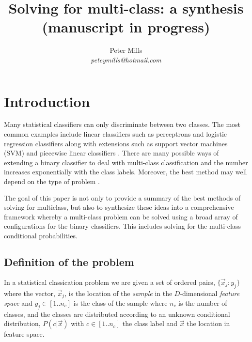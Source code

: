 \documentclass{article}
\begin{document}
\title{Solving for multi-class: a synthesis\\(manuscript in progress)}

\author{Peter Mills\\\textit{peteymills@hotmail.com}}

\maketitle

\section{Introduction}

Many statistical classifiers can only discriminate between two classes.
The most common examples include linear classifiers such as perceptrons and
logistic regression classifiers \citep{Michie_etal1994} along with extensions
such as support vector machines (SVM) \citep{Mueller_etal2001} and 
piecewise linear classifiers \citep{Mills2011, Bagirov2005}.
There are many possible ways of extending a binary classifier to deal
with multi-class classification and the number increases exponentially
with the class labels.
Moreover, the best method may well depend on the type of problem
\citep{Dietterich_Bakiri1995,Allwein_etal2000}.

The goal of this paper is not only to provide a summary of the
best methods of solving for multiclass, but also to synthesize
these ideas into a comprehensive framework whereby a multi-class problem
can be solved using a broad array of configurations for the binary
classifiers. 
This includes solving for the multi-class conditional probabilities.

\subsection{Definition of the problem}

\label{description}

In a statistical classication problem we are given a set of ordered pairs, 
$\lbrace \vec x_j : y_j \rbrace$ 
where the vector, $\vec x_j$, is the location of the {\it sample} in 
the $D$-dimensional {\it feature space} 
and $y_j \in [1..n_c]$ is the class of the sample
where $n_c$ is the number of classes,
and the classes are
distributed according to an unknown conditional distribution,
$P(c | \vec x)$ with $c \in [1..n_c]$ the class label and $\vec x$ the location
in feature space.
\end{document}
